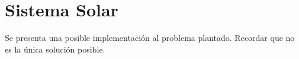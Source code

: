 \section{Sistema Solar}



Se presenta una posible implementación al problema plantado. Recordar que no es la única solución posible.



